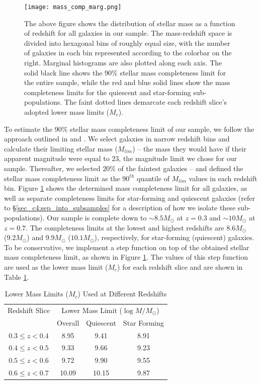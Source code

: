 \begin{figure}[htb]
    \centering
    \texttt{[image: mass\_comp\_marg.png]}
    \caption{The above figure shows the distribution of stellar mass as a function of redshift for all galaxies in our sample. The mass-redshift space is divided into hexagonal bins of roughly equal size, with the number of galaxies in each bin represented according to the colorbar on the right. Marginal histograms are also plotted along each axis. The solid black line shows the $90\%$ stellar mass completeness limit for the entire sample, while the red and blue solid lines show the mass completeness limits for the quiescent and star-forming sub-populations. The faint dotted lines demarcate each redshift slice's adopted lower mass limits ($M_c$).}
    \label{fig_c4:mass_comp}
\end{figure}

To estimate the $90\%$ stellar mass completeness limit of our sample, we follow the approach outlined in \citet{pozzetti_10} and \citet{Weigel16}. We select galaxies in narrow redshift bins and calculate their limiting stellar mass ($M_{lim}$) -- the mass they would have if their apparent magnitude were equal to $23$, the magnitude limit we chose for our sample. Thereafter, we selected $20\%$ of the faintest galaxies -- and defined the stellar mass completeness limit as the $90^{th}$ quantile  of $M_{lim}$ values in each redshift bin. Figure \ref{fig_c4:mass_comp} shows the determined mass completeness limit for all galaxies, as well as separate completeness limits for star-forming and quiescent galaxies (refer to \S \ref{sec_c4:sep_into_subsamples} for a description of how we isolate these sub-populations). Our sample is complete down to $\sim8.5 M_{\odot}$ at $z=0.3$ and $\sim10M_{\odot}$ at $z=0.7$. The completeness limits at the lowest and highest redshifts are 8.6$M_{\odot}$ (9.2$M_\odot$) and 9.9$M_\odot$ ($10.1 M_\odot$), respectively, for star-forming (quiescent) galaxies. To be conservative, we implement a step function on top of the obtained stellar mass completeness limit, as shown in Figure \ref{fig_c4:mass_comp}. The values of this step function are used as the lower mass limit ($M_c$) for each redshift slice and are shown in Table \ref{tab_c4:mass_comp}.

\begin{table}[htbp]
    \centering
    \caption{Lower Mass Limits ($M_c$) Used at Different Redshifts\label{tab_c4:mass_comp}}
    \begin{tabular}{c|ccc}
    \hline
    \hline
    Redshift Slice & \multicolumn{3}{c}{Lower Mass Limit ($\log M/M_\odot$)}\\
    & Overall & Quiescent & Star Forming \\
    \hline
    \hline
    $0.3 \leq z < 0.4$ & 8.95 & 9.41 & 8.91 \\
    $0.4 \leq z < 0.5$ & 9.33 & 9.66 & 9.23 \\
    $0.5 \leq z < 0.6$ & 9.72 & 9.90 & 9.55 \\
    $0.6 \leq z < 0.7$ & 10.09 & 10.15 & 9.87 \\
    \hline
    \hline
    \end{tabular}
\end{table}

